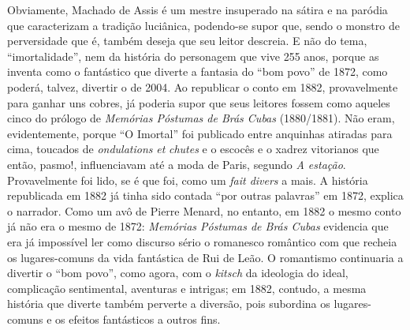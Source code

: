 Obviamente, Machado de Assis é um mestre insuperado na sátira e na
paródia que caracterizam a tradição luciânica, podendo-se supor que,
sendo o monstro de perversidade que é, também deseja que seu leitor
descreia. E não do tema, ``imortalidade'', nem da história do personagem
que vive 255 anos, porque as inventa como o fantástico que diverte a
fantasia do ``bom povo'' de 1872, como poderá, talvez, divertir o de 2004.
Ao republicar o conto em 1882, provavelmente para ganhar uns cobres, já
poderia supor que seus leitores fossem como aqueles cinco do prólogo de
\emph{Memórias Póstumas de Brás Cubas} (1880/1881). Não eram,
evidentemente, porque ``O Imortal'' foi publicado entre anquinhas atiradas
para cima, toucados de \emph{ondulations} \emph{et} \emph{chutes} e o
escocês e o xadrez vitorianos que então, pasmo!, influenciavam até a
moda de Paris, segundo \emph{A estação}. Provavelmente foi lido, se é
que foi, como um \emph{fait divers} a mais. A história republicada em
1882 já tinha sido contada ``por outras palavras'' em 1872, explica o
narrador. Como um avô de Pierre Menard, no entanto, em 1882 o mesmo
conto já não era o mesmo de 1872: \emph{Memórias Póstumas de Brás Cubas}
evidencia que era já impossível ler como discurso sério o romanesco
romântico com que recheia os lugares-comuns da vida fantástica de Rui de
Leão. O romantismo continuaria a divertir o ``bom povo'', como agora, com
o \emph{kitsch} da ideologia do ideal, complicação sentimental,
aventuras e intrigas; em 1882, contudo, a mesma história que diverte
também perverte a diversão, pois subordina os lugares-comuns e os
efeitos fantásticos a outros fins.

